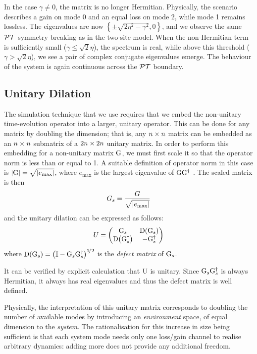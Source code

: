 In the case \(\gamma \neq 0\), the matrix is no longer Hermitian. Physically,
the scenario describes a gain on mode 0 and an equal loss on mode 2, while
mode 1 remains lossless. The eigenvalues are now \(\left\{ \pm \sqrt{2 \eta^{2}
- \gamma^{2}}, 0 \right\}\), and we observe the same \(\mathcal{PT}\) symmetry breaking
as in the two-site model. When the non-Hermitian term is sufficiently small
(\(\gamma \leq \sqrt{2} \eta\)), the spectrum is real, while above this
threshold (\(\gamma > \sqrt{2} \eta\)), we see a pair of complex conjugate
eigenvalues emerge. The behaviour of the system is again continuous across the
\(\mathcal{PT}\) boundary.

\subsection{Unitary Dilation}
The simulation technique that we use requires that we embed the non-unitary
time-evolution operator into a larger, unitary operator. This can be done for
any matrix by doubling the dimension; that is, any \(n \times n\) matrix can be
embedded as an \(n \times n\) submatrix of a \(2n \times 2n\) unitary matrix. In order
to perform this embedding for a non-unitary matrix \(\mathrm{G}\), we must first
scale it so that the operator norm is less than or equal to 1. A suitable
definition of operator norm in this case is \(\left|\mathrm{G}\right| = \sqrt{\left|e_{
\text{max}}\right|}\), where \(e_{\text{max}}\) is the largest eigenvalue of 
\(\mathrm{GG^{\dagger}}\) \cite{dilation}. The scaled matrix is then
\begin{equation}
  G_{s} = \frac{G}{\sqrt{\left|e_{\text{max}}\right|}}
\end{equation}
and the unitary dilation can be expressed as follows:
\begin{equation}
  U = \begin{pmatrix}
    \mathrm{G}_{s} & \mathrm{D}\!\left(\mathrm{G}_{s}\right) \\
    \mathrm{D}\!\left(\mathrm{G}_{s}^{\dagger}\right) & -\mathrm{G}_{s}^{\dagger} \end{pmatrix}
\end{equation}
where \(\mathrm{D}\!\left(\mathrm{G}_{s}\right) = \left( \mathbb{I} - \mathrm{G}_{s}\mathrm{G}_{s}^{
\dagger} \right)^{1\!/2}
\) is the \emph{defect matrix} of \(\mathrm{G}_{s}\).

It can be verified by explicit calculation that \(\mathrm{U}\) is unitary.
Since \(\mathrm{G}_{s}\mathrm{G}_{s}^{\dagger}\) is always Hermitian, it always has
real eigenvalues and thus the defect matrix is well defined.

Physically, the interpretation of this unitary matrix corresponds to doubling
the number of available modes by introducing an \emph{environment} space, of
equal dimension to the \emph{system}. The rationalisation for this increase in
size being sufficient is that each system mode needs only one loss/gain channel
to realise arbitrary dynamics: adding more does not provide any additional
freedom.

